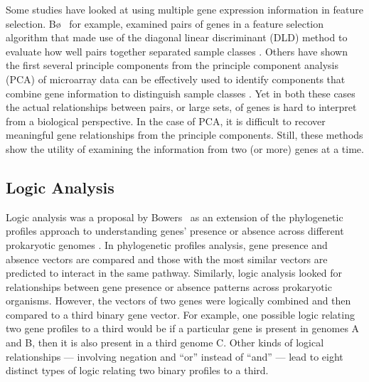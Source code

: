 Some studies have looked at using multiple gene expression information in
feature selection.  B{\o} \ea\, for example, examined pairs of genes in a
feature selection algorithm that made use of the diagonal linear discriminant
(DLD) method to evaluate how well pairs together separated sample classes
\cite{PMID_11983058}.  Others have shown the first several principle components
from the principle component analysis (PCA) of microarray data can be
effectively used to identify components that combine gene information to
distinguish sample classes \cite{PMID_173481048,PMID_11126130,PMID_10963673}.
Yet in both these cases the actual relationships between pairs, or large sets,
of genes is hard to interpret from a biological perspective. In the case of
PCA, it is difficult to recover meaningful gene relationships from the
principle components.  Still, these methods show the utility of examining the
information from two (or more) genes at a time.

\subsection{Logic Analysis}

Logic analysis was a proposal by Bowers \ea\ as an extension of
the phylogenetic profiles approach to understanding genes' presence or absence
across different prokaryotic genomes \cite{PMID_144923264,pellegrini1999apf}.
In phylogenetic profiles analysis, gene presence and absence vectors are compared and
those with the most similar vectors are predicted to interact in the same
pathway.  Similarly, logic analysis looked for relationships between gene
presence or absence patterns across prokaryotic organisms. However, the vectors of two
genes were logically combined and then compared to a third binary gene vector.
For example, one possible logic relating two gene profiles to a third would be
if a particular gene is present in genomes A and B, then it is also present in a
third genome C.  Other kinds of logical relationships --- involving negation
and ``or'' instead of ``and'' --- lead to eight distinct types of logic relating
two binary profiles to a third.

